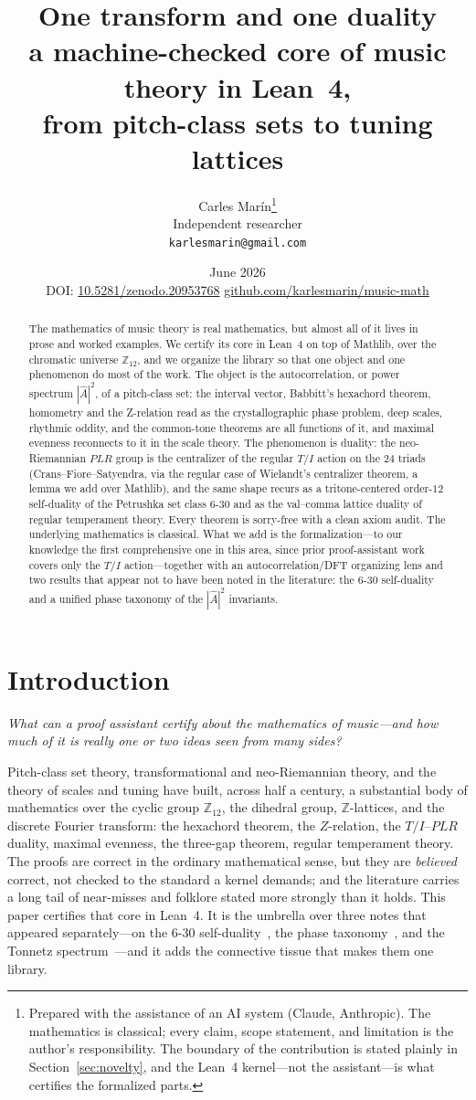 \documentclass[11pt]{article}
\title{\bf One transform and one duality\\[5pt]
  \large\rm a machine-checked core of music theory in Lean~4,\\
  from pitch-class sets to tuning lattices}
\author{Carles Mar\'in\thanks{Prepared with the assistance of an AI system (Claude, Anthropic).
The mathematics is classical; every claim, scope statement, and limitation is the author's
responsibility. The boundary of the contribution is stated plainly in
Section~\ref{sec:novelty}, and the Lean~4 kernel---not the assistant---is what certifies the
formalized parts.}\\[3pt]
  \normalsize Independent researcher\\
  \normalsize \texttt{karlesmarin@gmail.com}}
\date{June 2026\\[3pt]\normalsize DOI: \href{https://doi.org/10.5281/zenodo.20953768}{10.5281/zenodo.20953768}\quad\textbullet\quad
  \href{https://github.com/karlesmarin/music-math}{github.com/karlesmarin/music-math}}
\newcommand{\Ztwelve}{\mathbb{Z}_{12}}
\newcommand{\Ahat}{\hat{A}}
\newcommand{\question}[1]{\smallskip\noindent\textit{#1}\smallskip}
\begin{document}
\maketitle

\begin{abstract}\noindent
The mathematics of music theory is real mathematics, but almost all of it lives in prose and
worked examples. We certify its core in Lean~4 on top of Mathlib, over the chromatic universe
$\Ztwelve$, and we organize the library so that one object and one phenomenon do most of the
work. The object is the autocorrelation, or power spectrum $|\Ahat|^2$, of a pitch-class set:
the interval vector, Babbitt's hexachord theorem, homometry and the Z-relation read as the
crystallographic phase problem, deep scales, rhythmic oddity, and the common-tone theorems are
all functions of it, and maximal evenness reconnects to it in the scale theory. The phenomenon
is duality: the neo-Riemannian $PLR$ group is the centralizer of the regular $T/I$ action on
the $24$ triads (Crans--Fiore--Satyendra, via the regular case of Wielandt's centralizer
theorem, a lemma we add over Mathlib), and the same shape recurs as a tritone-centered
order-$12$ self-duality of the Petrushka set class $6$-$30$ and as the val--comma lattice
duality of regular temperament theory. Every theorem is sorry-free with a clean axiom audit.
The underlying mathematics is classical. What we add is the formalization---to our knowledge
the first comprehensive one in this area, since prior proof-assistant work covers only the
$T/I$ action---together with an autocorrelation/DFT organizing lens and two results that
appear not to have been noted in the literature: the $6$-$30$ self-duality and a unified phase
taxonomy of the $|\Ahat|^2$ invariants.
\end{abstract}

\section{Introduction}\label{sec:intro}

\question{What can a proof assistant certify about the mathematics of music---and how much of
it is really one or two ideas seen from many sides?}

Pitch-class set theory, transformational and neo-Riemannian theory, and the theory of scales
and tuning have built, across half a century, a substantial body of mathematics over the cyclic
group $\Ztwelve$, the dihedral group, $\mathbb{Z}$-lattices, and the discrete Fourier transform:
the hexachord theorem, the $Z$-relation, the $T/I$--$PLR$ duality, maximal evenness, the
three-gap theorem, regular temperament theory. The proofs are correct in the ordinary
mathematical sense, but they are \emph{believed} correct, not checked to the standard a kernel
demands; and the literature carries a long tail of near-misses and folklore stated more strongly
than it holds. This paper certifies that core in Lean~4. It is the umbrella over three notes
that appeared separately---on the $6$-$30$ self-duality~\cite{Note1}, the phase
taxonomy~\cite{Note2}, and the Tonnetz spectrum~\cite{Note3}---and it adds the connective tissue
that makes them one library.
\end{document}
